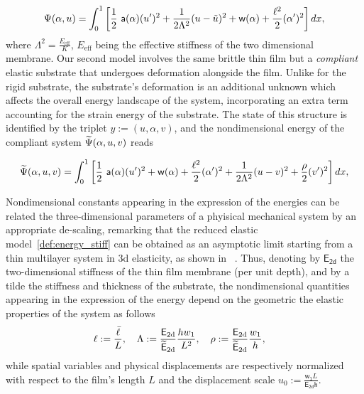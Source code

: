 \begin{equation}
    \label{def:energy_stiff}
    \Psi(\alpha, u) = \int_{0}^{1} \left[ \frac{1}{2} \ \soften(\alpha)(u')^2 
    + \frac{1}{2 \elastell^2} (u-\subsu)^2
    + \homogdiss(\alpha) + \frac{\damagell^2}{2}(\alpha')^2 
     \right] dx,
\end{equation}
where $\Lambda^2 = \frac{E_{\text{eff}}}{K}$, $E_{\text{eff}}$ being the effective stiffness of the two dimensional membrane.
Our second model involves the same brittle thin film but a \emph{compliant} elastic substrate that undergoes deformation alongside the film. Unlike for the rigid substrate, the substrate's deformation is an additional unknown which affects the overall energy landscape of the system, incorporating an extra term accounting for the strain energy of the substrate. 
The state of this structure is identified by the triplet $y:=(u, \alpha, v)$, and the nondimensional energy of the compliant system  $\widetilde\Psi(\alpha, u, v)$ reads

\begin{equation}
    \label{def:energy_compliant}
    \Ecompl(\alpha, u,  v) = \int_{0}^1 \left[ \frac{1}{2} \ \soften(\alpha)(u')^2 + \homogdiss(\alpha) + \frac{\damagell^2}{2}(\alpha')^2 
    + \frac{1}{2 \elastell^2} (u- v)^2 
    + \frac{\stiffratio}{2}  (v')^2 \right] dx,
\end{equation}



Nondimensional constants appearing in the expression of the energies can be related the three-dimensional parameters of a phyisical mechanical system by an appropriate de-scaling, remarking that the reduced elastic model~\eqref{def:energy_stiff} can be obtained as an asymptotic limit starting from a thin multilayer system in 3d elasticity, as shown in~\cite{Leon_Baldelli2015-rp} .
Thus, denoting by $\mathsf{E_\text{2d}}$ the two-dimensional stiffness of the thin film membrane (per unit depth), and by a tilde the stiffness and thickness of the substrate, the nondimensional quantities appearing in the expression of the energy depend on the geometric the elastic properties of the system as follows
\begin{equation}
    \label{def:dimensional_parameters}
    \ell := \frac{\bar{\ell}}{L}, \quad
    \Lambda := \frac{\mathsf{E_{\text{2d}}}}{{\mathsf{\widetilde E_{\text{2d}}}}}\frac{h w_1}{L^2}, \quad
    \rho := \frac{\mathsf{E_{\text{2d}}}}{{\mathsf{\widetilde E_{\text{2d}}}}}\frac{w_1}{h}, \quad
\end{equation}
while spatial variables and physical displacements are respectively normalized with respect to the film's length $L$ and the displacement scale $u_0 := \frac{\mathsf{w_1}L}{\mathsf{E_{\text{2d}} h}}$.




